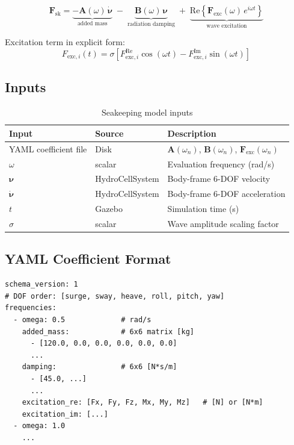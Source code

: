 \documentclass[12pt,a4paper]{article}
\newcommand{\nuvec}{\boldsymbol{\nu}}
\newcommand{\nudot}{\dot{\boldsymbol{\nu}}}
\newcommand{\Fvec}{\mathbf{F}}
\newcommand{\Avec}{\mathbf{A}}
\newcommand{\Bvec}{\mathbf{B}}
\begin{document}
\begin{equation}
  \boxed{
  \Fvec_{\text{sk}}
    = \underbrace{-\Avec(\omega)\,\nudot}_{\text{added mass}}
    \;-\; \underbrace{\Bvec(\omega)\,\nuvec}_{\text{radiation damping}}
    \;+\; \underbrace{\text{Re}\!\left\{\Fvec_{\text{exc}}(\omega)\,e^{i\omega t}\right\}}_{\text{wave excitation}}
  }
  \label{eq:seakeeping}
\end{equation}

Excitation term in explicit form:
\begin{equation}
  F_{\text{exc},i}(t)
    = \sigma\!\left[F_{\text{exc},i}^{\text{Re}}\cos(\omega t)
      - F_{\text{exc},i}^{\text{Im}}\sin(\omega t)\right]
  \label{eq:excitation}
\end{equation}

\subsection{Inputs}

\begin{table}[H]
  \centering
  \caption{Seakeeping model inputs}
  \begin{tabularx}{\linewidth}{llX}
    \toprule
    \textbf{Input} & \textbf{Source} & \textbf{Description} \\
    \midrule
    YAML coefficient file & Disk & $\Avec(\omega_n)$, $\Bvec(\omega_n)$, $\Fvec_{\text{exc}}(\omega_n)$ \\
    $\omega$ & scalar & Evaluation frequency (rad/s) \\
    $\nuvec$ & HydroCellSystem & Body-frame 6-DOF velocity \\
    $\nudot$ & HydroCellSystem & Body-frame 6-DOF acceleration \\
    $t$ & Gazebo & Simulation time (s) \\
    $\sigma$ & scalar & Wave amplitude scaling factor \\
    \bottomrule
  \end{tabularx}
\end{table}

\subsection{YAML Coefficient Format}

\begin{lstlisting}
schema_version: 1
# DOF order: [surge, sway, heave, roll, pitch, yaw]
frequencies:
  - omega: 0.5             # rad/s
    added_mass:            # 6x6 matrix [kg]
      - [120.0, 0.0, 0.0, 0.0, 0.0, 0.0]
      ...
    damping:               # 6x6 [N*s/m]
      - [45.0, ...]
      ...
    excitation_re: [Fx, Fy, Fz, Mx, My, Mz]   # [N] or [N*m]
    excitation_im: [...]
  - omega: 1.0
    ...
\end{lstlisting}
\end{document}
